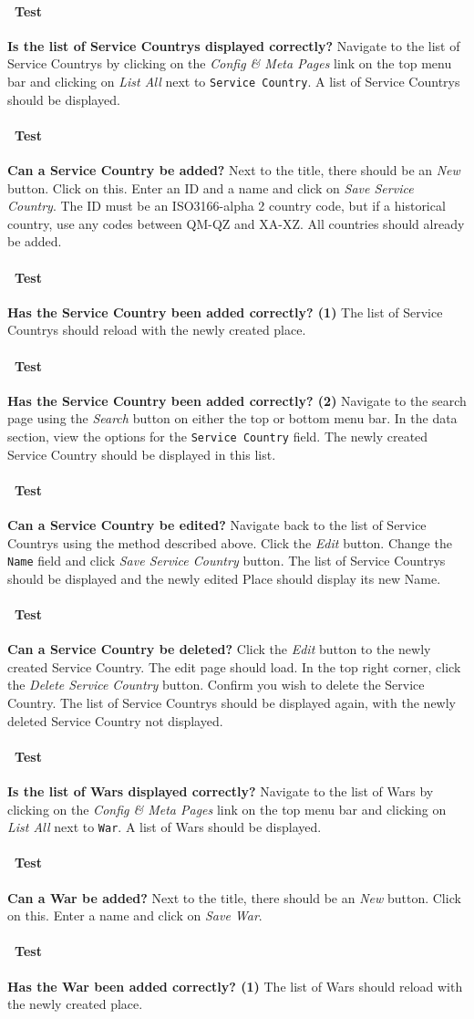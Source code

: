 \documentclass[12pt]{article}
\newcounter{Test}
\newcommand{\test}[1]{%
\stepcounter{Test}%
\paragraph{\Circle\ Test \theTest} \textbf{#1} }
\begin{document}
\test{Is the list of Service Countrys displayed correctly?}
Navigate to the list of Service Countrys by clicking on the \textit{Config \& Meta Pages} link on the top menu bar and clicking on \textit{List All} next to \texttt{Service Country}. A list of Service Countrys should be displayed.

\test{Can a Service Country be added?}
Next to the title, there should be an \textit{New} button. Click on this. Enter an ID and a name and click on \textit{Save Service Country}. The ID must be an ISO3166-alpha 2 country code, but if a historical country, use any codes between QM-QZ and XA-XZ. All countries should already be added.

\test{Has the Service Country been added correctly? (1)}
The list of Service Countrys should reload with the newly created place.

\test{Has the Service Country been added correctly? (2)}
Navigate to the search page using the \textit{Search} button on either the top or bottom menu bar. In the data section, view the options for the \texttt{Service Country} field. The newly created Service Country should be displayed in this list.

\test{Can a Service Country be edited?}
Navigate back to the list of Service Countrys using the method described above. Click the \textit{Edit} button. Change the \texttt{Name} field and click \textit{Save Service Country} button. The list of Service Countrys should be displayed and the newly edited Place should display its new Name.

\test{Can a Service Country be deleted?}
Click the \textit{Edit} button to the newly created Service Country. The edit page should load. In the top right corner, click the \textit{Delete Service Country} button. Confirm you wish to delete the Service Country. The list of Service Countrys should be displayed again, with the newly deleted Service Country not displayed.

\test{Is the list of Wars displayed correctly?}
Navigate to the list of Wars by clicking on the \textit{Config \& Meta Pages} link on the top menu bar and clicking on \textit{List All} next to \texttt{War}. A list of Wars should be displayed.

\test{Can a War be added?}
Next to the title, there should be an \textit{New} button. Click on this. Enter a name and click on \textit{Save War}.

\test{Has the War been added correctly? (1)}
The list of Wars should reload with the newly created place.
\end{document}
